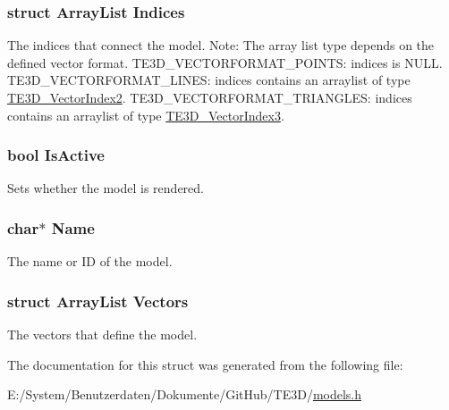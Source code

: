 \hypertarget{struct_t_e3_d___model4f_ac88633aa6222f5cafbb81f7c5edf6706}{
\subsubsection[{Indices}]{\setlength{\rightskip}{0pt plus 5cm}struct {\bf Array\-List} Indices}}\label{struct_t_e3_d___model4f_ac88633aa6222f5cafbb81f7c5edf6706}
The indices that connect the model. Note\-: The array list type depends on the defined vector format. T\-E3\-D\-\_\-\-V\-E\-C\-T\-O\-R\-F\-O\-R\-M\-A\-T\-\_\-\-P\-O\-I\-N\-T\-S\-: indices is N\-U\-L\-L. T\-E3\-D\-\_\-\-V\-E\-C\-T\-O\-R\-F\-O\-R\-M\-A\-T\-\_\-\-L\-I\-N\-E\-S\-: indices contains an arraylist of type \hyperlink{struct_t_e3_d___vector_index2}{T\-E3\-D\-\_\-\-Vector\-Index2}. T\-E3\-D\-\_\-\-V\-E\-C\-T\-O\-R\-F\-O\-R\-M\-A\-T\-\_\-\-T\-R\-I\-A\-N\-G\-L\-E\-S\-: indices contains an arraylist of type \hyperlink{struct_t_e3_d___vector_index3}{T\-E3\-D\-\_\-\-Vector\-Index3}. \hypertarget{struct_t_e3_d___model4f_a92c6b1cf703f9e064f5efc0907f80379}{
\subsubsection[{Is\-Active}]{\setlength{\rightskip}{0pt plus 5cm}bool Is\-Active}}\label{struct_t_e3_d___model4f_a92c6b1cf703f9e064f5efc0907f80379}


Sets whether the model is rendered. 

\hypertarget{struct_t_e3_d___model4f_a5e6182c030324511dd82e9fa1a0ab071}{
\subsubsection[{Name}]{\setlength{\rightskip}{0pt plus 5cm}char$\ast$ Name}}\label{struct_t_e3_d___model4f_a5e6182c030324511dd82e9fa1a0ab071}


The name or I\-D of the model. 

\hypertarget{struct_t_e3_d___model4f_aa9dfdc40d8e1a7c6027adadf256728e5}{
\subsubsection[{Vectors}]{\setlength{\rightskip}{0pt plus 5cm}struct {\bf Array\-List} Vectors}}\label{struct_t_e3_d___model4f_aa9dfdc40d8e1a7c6027adadf256728e5}


The vectors that define the model. 



The documentation for this struct was generated from the following file\-:\begin{DoxyCompactItemize}
\item 
E\-:/\-System/\-Benutzerdaten/\-Dokumente/\-Git\-Hub/\-T\-E3\-D/\hyperlink{models_8h}{models.\-h}\end{DoxyCompactItemize}
